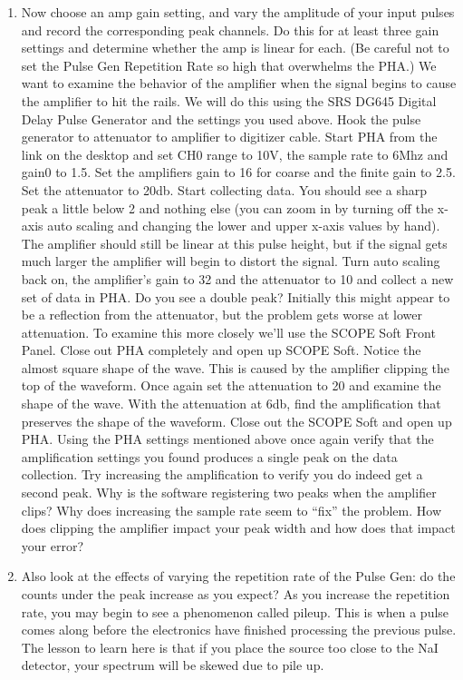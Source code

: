 \documentclass{../lab}
\begin{document}
\begin{enumerate}
\begin{enumerate}
    \end{enumerate}

    \item Now choose an amp gain setting, and vary the amplitude of your input pulses and record the corresponding peak channels. Do this for at least three gain settings and determine whether the amp is linear for each. (Be careful not to set the Pulse Gen Repetition Rate so high that overwhelms the PHA.) We want to examine the behavior of the amplifier when the signal begins to cause the amplifier to hit the rails. We will do this using the SRS DG645 Digital Delay Pulse Generator and the settings you used above. Hook the pulse generator to attenuator to amplifier to digitizer cable. Start PHA from the link on the desktop and set CH0 range to 10V, the sample rate to 6Mhz and gain0 to 1.5. Set the amplifiers gain to 16 for coarse and the finite gain to 2.5. Set the attenuator to 20db. Start collecting data. You should see a sharp peak a little below 2 and nothing else (you can zoom in by turning off the x-axis auto scaling and changing the lower and upper x-axis values by hand). The amplifier should still be linear at this pulse height, but if the signal gets much larger the amplifier will begin to distort the signal. Turn auto scaling back on, the amplifier's gain to 32 and the attenuator to 10 and collect a new set of data in PHA. Do you see a double peak? Initially this might appear to be a reflection from the attenuator, but the problem gets worse at lower attenuation. To examine this more closely we'll use the SCOPE Soft Front Panel. Close out PHA completely and open up SCOPE Soft. Notice the almost square shape of the wave. This is caused by the amplifier clipping the top of the waveform. Once again set the attenuation to 20 and examine the shape of the wave. With the attenuation at 6db, find the amplification that preserves the shape of the waveform. Close out the SCOPE Soft and open up PHA. Using the PHA settings mentioned above once again verify that the amplification settings you found produces a single peak on the data collection. Try increasing the amplification to verify you do indeed get a second peak. Why is the software registering two peaks when the amplifier clips? Why does increasing the sample rate seem to ``fix'' the problem. How does clipping the amplifier impact your peak width and how does that impact your error?

    \item Also look at the effects of varying the repetition rate of the Pulse Gen: do the counts under the peak increase as you expect? As you increase the repetition rate, you may begin to see a phenomenon called pileup. This is when a pulse comes along before the electronics have finished processing the previous pulse. The lesson to learn here is that if you place the source too close to the NaI detector, your spectrum will be skewed due to pile up.
    

\end{enumerate}
\end{document}
